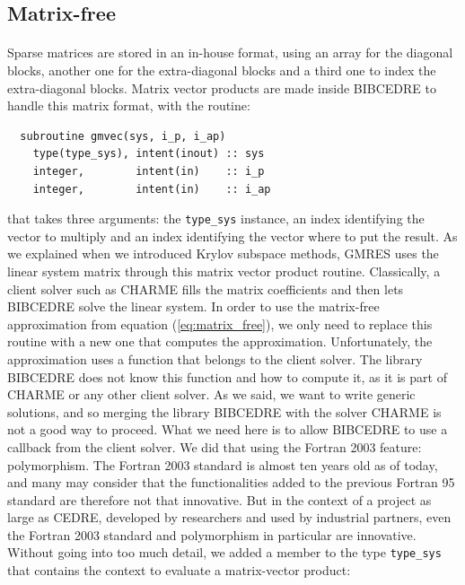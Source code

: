     \subsection{Matrix-free}

      \paragraph{}
      Sparse matrices are stored in an in-house format, using an array for the diagonal blocks, another one for the extra-diagonal blocks and a third one to index the extra-diagonal blocks.
      Matrix vector products are made inside BIBCEDRE to handle this matrix format, with the routine:
\begin{verbatim}
  subroutine gmvec(sys, i_p, i_ap)
    type(type_sys), intent(inout) :: sys
    integer,        intent(in)    :: i_p
    integer,        intent(in)    :: i_ap
\end{verbatim}
      that takes three arguments: the \texttt{type_sys} instance, an index identifying the vector to multiply and an index identifying the vector where to put the result.
      As we explained when we introduced Krylov subspace methods, GMRES uses the linear system matrix through this matrix vector product routine.
      Classically, a client solver such as CHARME fills the matrix coefficients and then lets BIBCEDRE solve the linear system.
      In order to use the matrix-free approximation from equation (\ref{eq:matrix_free}), we only need to replace this routine with a new one that computes the approximation.
      Unfortunately, the approximation uses a function that belongs to the client solver.
      The library BIBCEDRE does not know this function and how to compute it, as it is part of CHARME or any other client solver.
      As we said, we want to write generic solutions, and so merging the library BIBCEDRE with the solver CHARME is not a good way to proceed.
      What we need here is to allow BIBCEDRE to use a callback from the client solver.
      We did that using the Fortran 2003 feature: polymorphism.
      The Fortran 2003 standard is almost ten years old as of today, and many may consider that the functionalities added to the previous Fortran 95 standard are therefore not that innovative.
      But in the context of a project as large as CEDRE, developed by researchers and used by industrial partners, even the Fortran 2003 standard and polymorphism in particular are innovative.
      Without going into too much detail, we added a member to the type \texttt{type_sys} that contains the context to evaluate a matrix-vector product:
